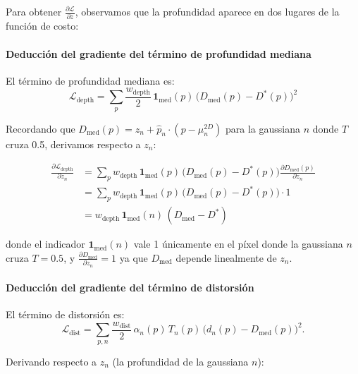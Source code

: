 Para obtener $\frac{\partial \mathcal{L}}{\partial z}$, observamos que la profundidad aparece en dos lugares de la función de costo:

\paragraph{Deducción del gradiente del término de profundidad mediana}

El término de profundidad mediana es:
\begin{equation}
\mathcal{L}_{\text{depth}} = \sum_{p} \frac{w_{\text{depth}}}{2}\, \mathbf{1}_{\text{med}}(p)\, \big(D_{\text{med}}(p) - D^*(p)\big)^2
\end{equation}

Recordando que $D_{\text{med}}(p) = z_n + \hat{p}_n \cdot (p - \mu_n^{2D})$ para la gaussiana $n$ donde $T$ cruza 0.5, derivamos respecto a $z_n$:

\begin{equation}
\begin{split}
\frac{\partial \mathcal{L}_{\text{depth}}}{\partial z_n} &= \sum_{p} w_{\text{depth}} \, \mathbf{1}_{\text{med}}(p) \, \big(D_{\text{med}}(p) - D^*(p)\big) \frac{\partial D_{\text{med}}(p)}{\partial z_n} \\
&= \sum_{p} w_{\text{depth}} \, \mathbf{1}_{\text{med}}(p) \, \big(D_{\text{med}}(p) - D^*(p)\big) \cdot 1 \\
&= w_{\text{depth}} \, \mathbf{1}_{\text{med}}(n) \, (D_{\text{med}} - D^*)
\end{split}
\end{equation}

\noindent donde el indicador $\mathbf{1}_{\text{med}}(n)$ vale 1 únicamente en el píxel donde la gaussiana $n$ cruza $T=0.5$, y $\frac{\partial D_{\text{med}}}{\partial z_n} = 1$ ya que $D_{\text{med}}$ depende linealmente de $z_n$.

\paragraph{Deducción del gradiente del término de distorsión}

El término de distorsión es:
\begin{equation}
\mathcal{L}_{\text{dist}} = \sum_{p,n} \frac{w_{\text{dist}}}{2}\, \alpha_n(p)\,T_n(p)\, \big(d_n(p)-D_{\text{med}}(p)\big)^2.
\end{equation}

Derivando respecto a $z_n$ (la profundidad de la gaussiana $n$):

